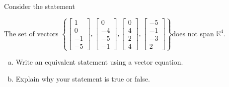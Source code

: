 
\begin{exerciseStatement}


Consider the statement 
\begin{center}\begin{minipage}{0.8\textwidth}
 The set of vectors \( \left\{ \left[\begin{array}{c}
1 \\
0 \\
-1 \\
-5
\end{array}\right] , \left[\begin{array}{c}
0 \\
-4 \\
-5 \\
-1
\end{array}\right] , \left[\begin{array}{c}
0 \\
4 \\
2 \\
4
\end{array}\right] , \left[\begin{array}{c}
-5 \\
-1 \\
-3 \\
2
\end{array}\right] \right\} \)does not span \(\mathbb{R}^4\). 
\end{minipage}\end{center}
    


\begin{enumerate}[(a)]
\item  Write an equivalent statement using a vector equation.
\item  Explain why your statement is true or false.
\end{enumerate}
    
\end{exerciseStatement}
    

